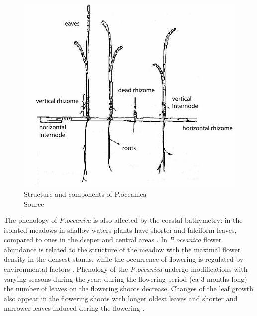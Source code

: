 \documentclass[10pt, a4paper]{article}
\begin{document}
\begin{figure}
\centering
\includegraphics[scale=0.15]{Fig-1-8.jpg}
\caption{Structure and components of
P.oceanica \\ Source \cite{DiCarlo04}\label{DiCarlo04}}
\label{fig:8}
\end{figure}

The phenology of \textit{P.oceanica} is also affected by the coastal bathymetry: in the isolated meadows in
shallow waters plants have shorter and falciform leaves, compared to ones in the deeper and central
areas \cite{Dural10}\label{Dural10}. In \textit{P.oceanica} flower abundance is related to the structure of the meadow with
the maximal flower density in the densest stands, while the occurrence of flowering is regulated by
environmental factors \cite{Buia91}\label{Buia91}. Phenology of the \textit{P.oceanica} undergo
modifications with varying seasons during the year: during the flowering period (ca 3 months long)
the number of leaves on the flowering shoots decrease. Changes of the leaf growth also appear in the
flowering shoots with longer oldest leaves and shorter and narrower leaves induced during the
flowering \cite{Gobert01}\label{Gobert01}.
\end{document}
